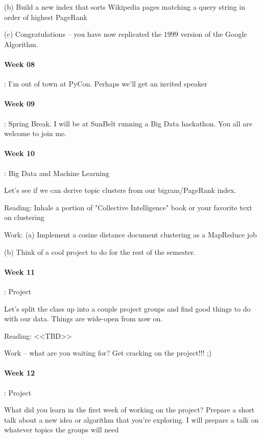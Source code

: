 \documentclass[12pt]{article}
\begin{document}
(b) Build a new index that sorts Wikipedia pages matching a query string in order of highest PageRank

(c) Congratulations -- you have now replicated the 1999 version of the Google Algorithm. 

\paragraph{Week 08}: I'm out of town at PyCon. Perhaps we'll get an invited speaker

\paragraph{Week 09}: Spring Break. I will be at SunBelt running a Big Data hackathon. You all are welcome to join me. 

\paragraph{Week 10}: Big Data and Machine Learning

Let's see if we can derive topic clusters from our bigram/PageRank index. 

Reading: 
Inhale a portion of "Collective Intelligence" book or your favorite text on clustering

Work:
(a) Implement a cosine distance document clustering as a MapReduce job

(b) Think of a cool project to do for the rest of the semester.

\paragraph{Week 11}: Project

Let's split the class up into a couple project groups and find good things to do with our data. Things are wide-open from now on.

Reading: <<TBD>>

Work -- what are you waiting for? Get cracking on the project!!! ;)

\paragraph{Week 12}: Project

What did you learn in the first week of working on the project? Prepare a short talk about a new idea or algorithm that you're exploring. 
I will prepare a talk on whatever topics the groups will need
\end{document}
